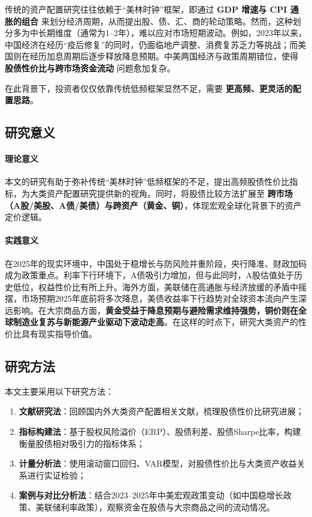 \documentclass[a4paper,12pt]{article}
\numberwithin{equation}{section}
\begin{document}
传统的资产配置研究往往依赖于“美林时钟”框架，即通过 \textbf{GDP 增速与 CPI 通胀的组合} 来划分经济周期，从而提出股、债、汇、商的轮动策略。然而，这种划分多为中长期维度（通常为1–2年），难以应对市场短期波动。例如，2023年以来，中国经济在经历“疫后修复”的同时，仍面临地产调整、消费复苏乏力等挑战；而美国则在经历加息周期后逐步释放降息预期。中美两国经济与政策周期错位，使得 \textbf{股债性价比与跨市场资金流动} 问题愈加复杂。

在此背景下，投资者仅仅依靠传统低频框架显然不足，需要 \textbf{更高频、更灵活的配置思路}。

\subsection{研究意义}
\paragraph{理论意义} 
本文的研究有助于弥补传统“美林时钟”低频框架的不足，提出高频股债性价比指标，为大类资产配置研究提供新的视角。同时，将股债比较方法扩展至 \textbf{跨市场（A股/美股、A债/美债）与跨资产（黄金、铜）}，体现宏观全球化背景下的资产定价逻辑。

\paragraph{实践意义}
在2025年的现实环境中，中国处于稳增长与防风险并重阶段，央行降准、财政加码成为政策重点。利率下行环境下，A债吸引力增加，但与此同时，A股估值处于历史低位，权益性价比有所上升。海外方面，美联储在高通胀与经济放缓的矛盾中摇摆，市场预期2025年底前将多次降息，美债收益率下行趋势对全球资本流向产生深远影响。在大宗商品方面，\textbf{黄金受益于降息预期与避险需求维持强势，铜价则在全球制造业复苏与新能源产业驱动下波动走高}。在这样的时点下，研究大类资产的性价比具有现实指导价值。

\subsection{研究方法}
本文主要采用以下研究方法：
\begin{enumerate}
    \item \textbf{文献研究法}：回顾国内外大类资产配置相关文献，梳理股债性价比研究进展；
    \item \textbf{指标构建法}：基于股权风险溢价（ERP）、股债利差、股债Sharpe比率，构建衡量股债相对吸引力的指标体系；
    \item \textbf{计量分析法}：使用滚动窗口回归、VAR模型，对股债性价比与大类资产收益关系进行实证检验；
    \item \textbf{案例与对比分析法}：结合2023–2025年中美宏观政策变动（如中国稳增长政策、美联储利率政策），观察资金在股债与大宗商品之间的流动情况。
\end{enumerate}
\end{document}
